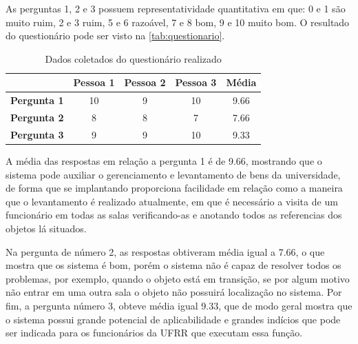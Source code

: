 \par
As perguntas 1, 2 e 3 possuem representatividade quantitativa em que: 0 e 1 são muito ruim, 2 e 3 ruim, 5 e 6 razoável, 7 e 8 bom, 9 e 10 muito bom. %
O resultado do questionário pode ser visto na \autoref{tab:questionario}.
\begin{table}[ht]
\centering
\caption{Dados coletados do questionário realizado}
\begin{tabular}{c|c|c|c||c|}
\cline{2-5}
                                          & \textbf{Pessoa 1} & \textbf{Pessoa 2} & \textbf{Pessoa 3} & \textbf{Média} \\ \hline
\multicolumn{1}{|c|}{\textbf{Pergunta 1}} & 10                & 9                 & 10                & 9.66           \\ \hline
\multicolumn{1}{|c|}{\textbf{Pergunta 2}} & 8                 & 8                 & 7                 & 7.66           \\ \hline
\multicolumn{1}{|c|}{\textbf{Pergunta 3}} & 9                 & 9                 & 10                & 9.33           \\ \hline
\end{tabular}
\label{tab:questionario}
\end{table}
\par
A média das respostas em relação a pergunta 1 é de 9.66, mostrando que o sistema pode auxiliar o gerenciamento e levantamento de bens da universidade, de forma que se implantando proporciona facilidade em relação como a maneira que o levantamento é realizado atualmente, em que é necessário a visita de um funcionário em todas as salas verificando-as e anotando todos as referencias dos objetos lá situados.

\par
Na pergunta de número 2, as respostas obtiveram média igual a 7.66, o que mostra que os sistema é bom, porém o sistema não é capaz de resolver todos os problemas, por exemplo, quando o objeto está em transição, se por algum motivo não entrar em uma outra sala o objeto não possuirá localização no sistema. Por fim, a pergunta número 3, obteve média igual 9.33, que de modo geral mostra que o sistema possui grande potencial de aplicabilidade e grandes indícios que pode ser indicada para os funcionários da UFRR que executam essa função.

